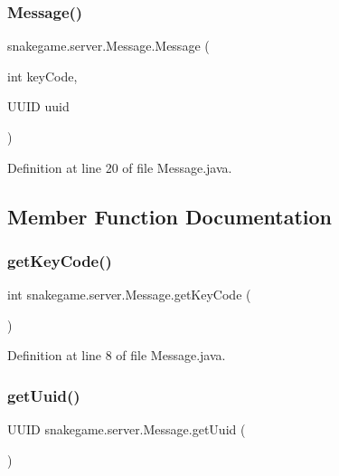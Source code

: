 \subsubsection{\texorpdfstring{Message()}{Message()}}
{\footnotesize\ttfamily snakegame.\+server.\+Message.\+Message (\begin{DoxyParamCaption}\item[{int}]{key\+Code,  }\item[{U\+U\+ID}]{uuid }\end{DoxyParamCaption})}



Definition at line 20 of file Message.\+java.



\subsection{Member Function Documentation}
\mbox{\label{classsnakegame_1_1server_1_1_message_ab530cae742ab3546af0531af6decfb4d}} 
\subsubsection{\texorpdfstring{get\+Key\+Code()}{getKeyCode()}}
{\footnotesize\ttfamily int snakegame.\+server.\+Message.\+get\+Key\+Code (\begin{DoxyParamCaption}{ }\end{DoxyParamCaption})}



Definition at line 8 of file Message.\+java.

\mbox{\label{classsnakegame_1_1server_1_1_message_a1813db6854615d0d545e7e7a24f73fe4}} 
\subsubsection{\texorpdfstring{get\+Uuid()}{getUuid()}}
{\footnotesize\ttfamily U\+U\+ID snakegame.\+server.\+Message.\+get\+Uuid (\begin{DoxyParamCaption}{ }\end{DoxyParamCaption})}



